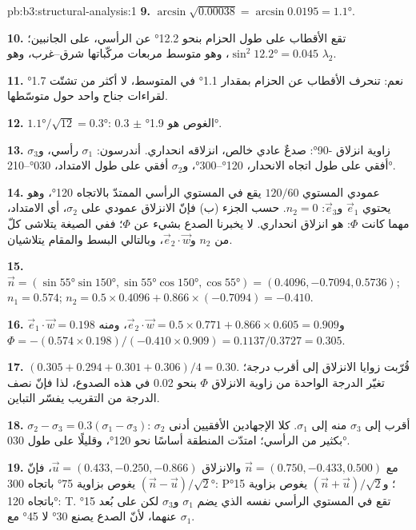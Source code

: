 \begin{solution}{pb:b3:structural-analysis:1}
\textbf{9.} $\arcsin\sqrt{0.00038} = \arcsin0.0195 = \ang{1.1}$.

\textbf{10.} تقع الأقطاب على طول الحزام بنحو \ang{12.2} عن الرأسي،
على الجانبين؛ $\sin^2\ang{12.2} = 0.045$، وهو متوسط مربعات
مركّباتها شرق--غرب، وهو $\lambda_2$.

\textbf{11.} نعم: تنحرف الأقطاب عن الحزام بمقدار \ang{1.1} في المتوسط، لا
أكثر من تشتّت \ang{1.7} لقراءات جناح واحد حول متوسّطها.

\textbf{12.} $\ang{1.1}/\sqrt{12} = \ang{0.3}$: الغوص هو \ang{1.9} $\pm$
\ang{0.3}.

\textbf{13.} زاوية انزلاق \ang{-90}: صدعٌ عادي خالص، انزلاقه انحداري. أندرسون:
$\sigma_1$ رأسي، و$\sigma_3$ أفقي على طول اتجاه الانحدار،
\ang{120}--\ang{300}، و$\sigma_2$ أفقي على طول الامتداد،
\ang{030}--\ang{210}.

\textbf{14.} عمودي المستوي $120/60$ يقع في المستوي الرأسي الممتدّ بالاتجاه
\ang{120}، وهو يحتوي $\vec e_1$ و$\vec e_3$: $n_2 = 0$. حسب الجزء (ب) فإنّ
الانزلاق عمودي على $\sigma_2$، أي الامتداد، مهما كانت $\Phi$: هو
انزلاق انحداري. لا يخبرنا الصدع بشيء عن $\Phi$؛ ففي الصيغة يتلاشى كلّ من $n_2$
و$\vec e_2\cdot\vec w$، وبالتالي البسط والمقام يتلاشيان.

\textbf{15.} $\vec n = (\sin\ang{55}\sin\ang{150}, \sin\ang{55}\cos\ang{150},
\cos\ang{55}) = (0.4096, -0.7094, 0.5736)$; $n_1 = 0.574$; $n_2 = 0.5\times
0.4096 + 0.866\times(-0.7094) = -0.410$.

\textbf{16.} $\vec e_1\cdot\vec w = 0.198$ و$\vec e_2\cdot\vec w = 0.5\times
0.771 + 0.866\times0.605 = 0.909$، ومنه $\Phi = -(0.574\times0.198)/(-0.410\times
0.909) = 0.1137/0.3727 = 0.305$.

\textbf{17.} $(0.305 + 0.294 + 0.301 + 0.306)/4 = 0.30$. قُرّبت زوايا الانزلاق
إلى أقرب درجة؛ تغيّر الدرجة الواحدة من زاوية الانزلاق $\Phi$ بنحو 0.02 في هذه
الصدوع، لذا فإنّ نصف الدرجة من التقريب يفسّر التباين.

\textbf{18.} $\sigma_2 - \sigma_3 = 0.3(\sigma_1 - \sigma_3)$: $\sigma_2$ أقرب
إلى $\sigma_3$ منه إلى $\sigma_1$. كلا الإجهادين الأفقيين أدنى بكثير
من الرأسي؛ امتدّت المنطقة أساسًا نحو \ang{120}، وقليلًا
على طول \ang{030}.

\textbf{19.} مع $\vec n = (0.750, -0.433, 0.500)$ والانزلاق $\vec u =
(0.433, -0.250, -0.866)$، فإنّ $(\vec n - \vec u)/\sqrt2$ يغوص بزاوية \ang{75} باتجاه
\ang{300}: P؛ و$(\vec n + \vec u)/\sqrt2$ يغوص بزاوية \ang{15} باتجاه \ang{120}:
T. تقع في المستوي الرأسي نفسه الذي يضم $\sigma_1$ و$\sigma_3$ لكن على بُعد
\ang{15} عنهما، لأنّ الصدع يصنع \ang{30} لا \ang{45} مع
$\sigma_1$.


\end{solution}
